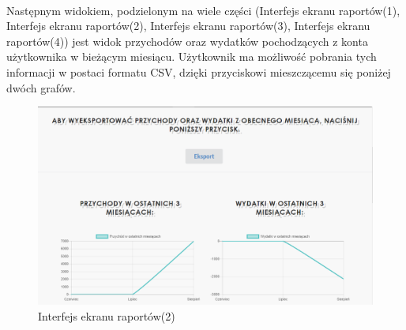 \documentclass{article}
\begin{document}
\paragraph*{} Następnym widokiem, podzielonym na wiele części (Interfejs ekranu raportów(1), Interfejs ekranu raportów(2), Interfejs ekranu raportów(3), Interfejs ekranu raportów(4)) jest widok przychodów oraz wydatków pochodzących z konta użytkownika w bieżącym miesiącu. Użytkownik ma możliwość pobrania tych informacji w postaci formatu CSV, dzięki przyciskowi mieszczącemu się poniżej dwóch grafów.
\begin{figure}[H]
	\hspace*{-2cm}
	\includegraphics[scale=0.5]{assets/rap2.png}
	\caption[]{Interfejs ekranu raportów(2)}
	\label{fig:rap2}
\end{figure}
\end{document}
